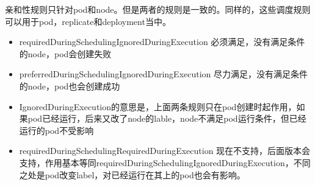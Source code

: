 亲和性规则只针对pod和node。但是两者的规则是一致的。同样的，这些调度规则可以用于pod，replicate和deployment当中。
\begin{itemize}
    \item requiredDuringSchedulingIgnoredDuringExecution   必须满足，没有满足条件的node，pod会创建失败
    \item preferredDuringSchedulingIgnoredDuringExecution  尽力满足，没有满足条件的node，pod也会创建成功
    \item IgnoredDuringExecution的意思是，上面两条规则只在pod创建时起作用，如果pod已经运行，后来又改了node的lable，node不满足pod运行条件，但已经运行的pod不受影响
    \item requiredDuringSchedulingRequiredDuringExecution  现在不支持，后面版本会支持，作用基本等同requiredDuringSchedulingIgnoredDuringExecution，不同之处是pod改变label，对已经运行在其上的pod也会有影响。
\end{itemize}

